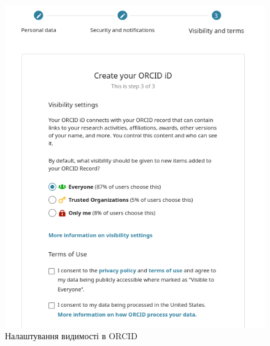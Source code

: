 \documentclass[oneside,14pt,a4paper]{extreport}
\begin{document}
\begin{figure}[H]
    \centering
    \includegraphics[width=15cm]{imgs/orcid_visibility.png}
    \caption{Налаштування видимості в ORCID}
    \label{pic:orcid-visibility}
\end{figure}
\end{document}
